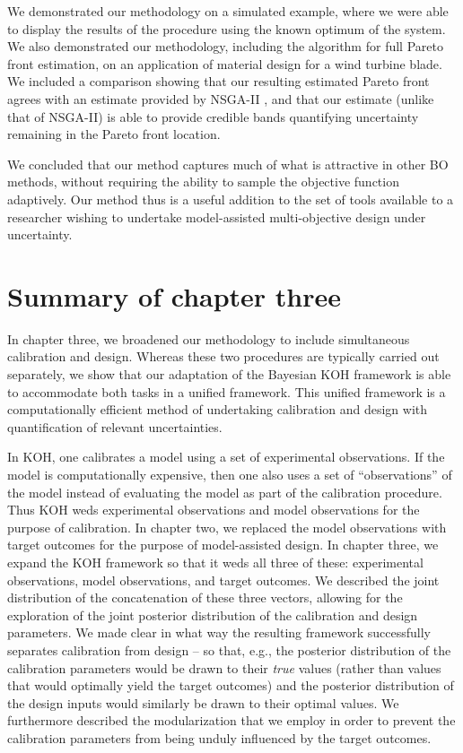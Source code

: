 \documentclass[10pt,a4paper]{article}
\begin{document}
We demonstrated our methodology on a simulated example, where we were able to display the results of the procedure using the known optimum of the system.
We also demonstrated our methodology, including the algorithm for full Pareto front estimation, on an application of material design for a wind turbine blade.
We included a comparison showing that our resulting estimated Pareto front agrees with an estimate provided by NSGA-II \citep{Deb2002}, and that our estimate (unlike that of NSGA-II) is able to provide credible bands quantifying uncertainty remaining in the Pareto front location.

We concluded that our method captures much of what is attractive in other BO methods, without requiring the ability to sample the objective function adaptively.
Our method thus is a useful addition to the set of tools available to a researcher wishing to undertake model-assisted multi-objective design under uncertainty.

\section{Summary of chapter three}

In chapter three, we broadened our methodology to include simultaneous calibration and design.
Whereas these two procedures are typically carried out separately, we show that our adaptation of the Bayesian KOH framework is able to accommodate both tasks in a unified framework.
This unified framework is a computationally efficient method of undertaking calibration and design with quantification of relevant uncertainties.

In KOH, one calibrates a model using a set of experimental observations.
If the model is computationally expensive, then one also uses a set of ``observations'' of the model instead of evaluating the model as part of the calibration procedure.
Thus KOH weds experimental observations and model observations for the purpose of calibration.
In chapter two, we replaced the model observations with target outcomes for the purpose of model-assisted design.
In chapter three, we expand the KOH framework so that it weds all three of these: experimental observations, model observations, and target outcomes.
We described the joint distribution of the concatenation of these three vectors, allowing for the exploration of the joint posterior distribution of the calibration and design parameters.
We made clear in what way the resulting framework successfully separates calibration from design -- so that, e.g., the posterior distribution of the calibration parameters would be drawn to their \textit{true} values (rather than values that would optimally yield the target outcomes) and the posterior distribution of the design inputs would similarly be drawn to their optimal values.
We furthermore described the modularization \citep{Liu2009} that we employ in order to prevent the calibration parameters from being unduly influenced by the target outcomes.
\end{document}
